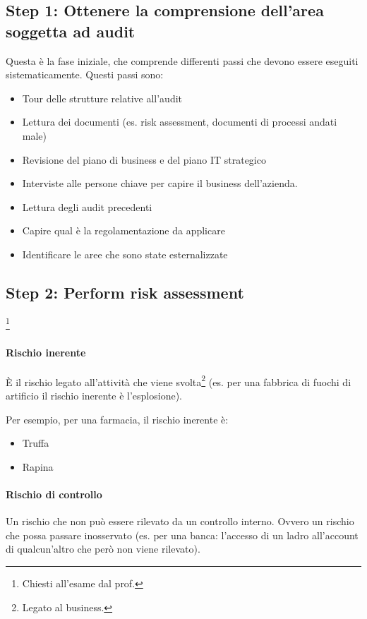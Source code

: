 \subsection{Step 1: Ottenere la comprensione dell'area soggetta ad audit}

Questa è la fase iniziale, che comprende differenti passi che devono essere 
eseguiti sistematicamente.
Questi passi sono:
\begin{itemize} 
\item Tour delle strutture relative all'audit
\item Lettura dei documenti (es. risk assessment, documenti di processi andati 
male)
\item Revisione del piano di business e del piano IT strategico
\item Interviste alle persone chiave per capire il business dell'azienda.
\item Lettura degli audit precedenti
\item Capire qual è la regolamentazione da applicare
\item Identificare le aree che sono state esternalizzate
\end{itemize}

\subsection{Step 2: Perform risk assessment} 

\footnote{Chiesti all'esame dal prof.}

\paragraph*{Rischio inerente}

È il rischio legato all'attività che viene svolta\footnote{Legato al business.} 
(es. per una fabbrica di fuochi di artificio il rischio inerente è 
l'esplosione).

Per esempio, per una farmacia, il rischio inerente è:
\begin{itemize}
\item Truffa
\item Rapina
\end{itemize}

\paragraph*{Rischio di controllo}

Un rischio che non può essere rilevato da un controllo interno. Ovvero un 
rischio che possa passare inosservato (es. per una banca: l'accesso di un ladro 
all'account di qualcun'altro che però non viene rilevato).


